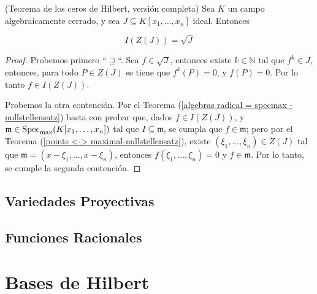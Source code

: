 \begin{theorem}(Teorema de los ceros de Hilbert, versión completa)
Sea $K$ un campo algebraicamente cerrado, y sea $J \subseteq K[x_1,\dots,x_n]$ ideal. Entonces

$$ I(Z(J)) = \sqrt{J}$$
\end{theorem}

\begin{proof}
Probemos primero ``$\supseteq$``. Sea $f \in \sqrt{J}$, entonces existe $k \in \mathbb{N}$ tal que $f^k \in J$, entonces, para todo $P \in Z(J)$ se tiene que $f^k(P) = 0$, y $f(P) = 0$. Por lo tanto $f \in I(Z(J))$.

Probemos la otra contención. Por el Teorema (\ref{algebras radical = specmax - nullstellensatz}) basta con probar que, dados $f\in I(Z(J))$, y $\mathfrak{m} \in \textrm{Spec}_{\textrm{max}}(K[x_1, \dots, x_n])$ tal que $I \subseteq \mathfrak{m}$, se cumpla que $f\in \mathfrak{m}$; pero por el Teorema (\ref{points <-> maximal-nullstellensatz}), existe $(\xi_1,\dots,\xi_n) \in Z(J)$ tal que $\mathfrak{m} = (x - \xi_1,\dots,x - \xi_n)$, entonces $f(\xi_1,\dots,\xi_n) = 0$ y $f \in \mathfrak{m}$. Por lo tanto, se cumple la segunda contención.
\end{proof}

\subsection{Variedades Proyectivas}



\subsection{Funciones Racionales}

\section{Bases de Hilbert}